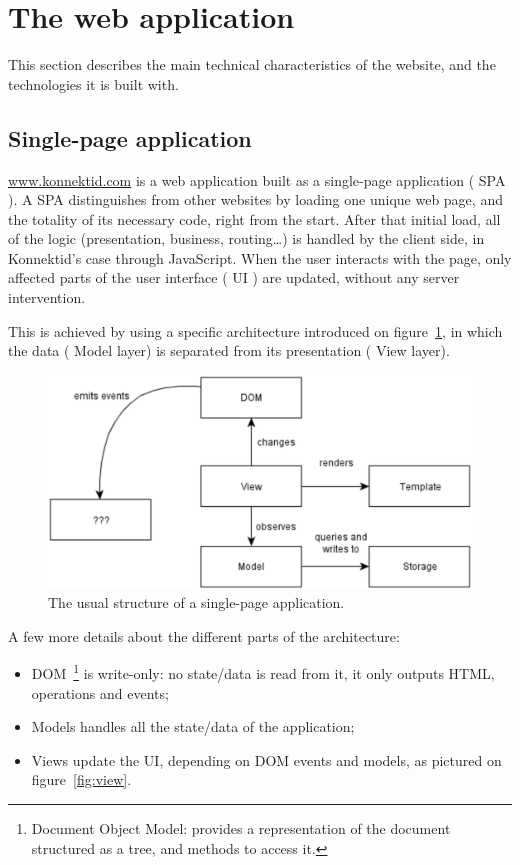 \section{The web application}
\label{sec:website}

This section describes the main technical characteristics of the website, and the technologies it is built with.

\subsection{Single-page application}
\label{ssec:spa}

\url{www.konnektid.com} is a web application built as a single-page application (\guillemotleft{} SPA \guillemotright{}).
A SPA distinguishes from other websites by loading one unique web page, and the totality of its necessary code, right from the start.
After that initial load, all of the logic (presentation, business, routing\ldots) is handled by the client side, in Konnektid's case through JavaScript.
When the user interacts with the page, only affected parts of the user interface (\guillemotleft{} UI \guillemotright{}) are updated, without any server intervention.

This is achieved by using a specific architecture introduced on {\sc figure}~\ref{fig:spaArchi}, in which the data (\guillemotleft{} Model
\guillemotright{} layer) is separated from its presentation (\guillemotleft{} View \guillemotright{} layer)\cite{spa}.

\begin{figure}[H]
    \centering
    \includegraphics{figure/spaArchi.png}
    \caption{The usual structure of a single-page application.}
    \label{fig:spaArchi}
\end{figure}

A few more details about the different parts of the architecture:
\begin{itemize}[noitemsep]
    \item DOM~\footnote{Document Object Model: provides a representation of the document structured as a tree, and methods to access it.} is write-only:
    no state/data is read from it, it only outputs HTML, operations and events;
    \item Models handles all the state/data of the application;
    \item Views update the UI, depending on DOM events and models, as pictured on {\sc figure}~\ref{fig:view}.
\end{itemize}


